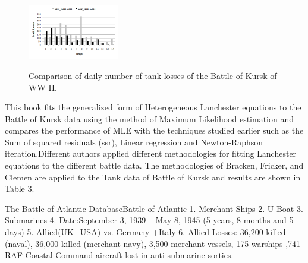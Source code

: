 \documentclass[]{article}
\begin{document}
\medskip

\begin{figure}
\centering
  \includegraphics[width=4cm]{figure3.eps.png}\\
  \caption{Comparison of daily number of tank losses of the Battle of Kursk of WW II.}
\end{figure}
This book fits the generalized form of Heterogeneous Lanchester equations to the Battle of Kursk data using the method of Maximum Likelihood estimation and compares the performance of MLE with the techniques studied earlier such as the Sum of squared residuals (\acrshort{ssr}), Linear regression and Newton-Raphson iteration.Different authors applied different methodologies for fitting Lanchester equations to the different battle data. The methodologies of Bracken, Fricker, and Clemen are applied to the Tank data of Battle of Kursk and results are shown in Table 3.

The Battle of Atlantic Database\gls{Battle of Atlantic}
1. Merchant Ships
2. U Boat
3. Submarines
4. Date:September 3, 1939 – May 8, 1945 (5 years, 8 months and 5 days)
5. Allied(UK+USA) vs. Germany +Italy
6. Allied Losses: 36,200 killed (naval), 36,000 killed (merchant navy),
3,500 merchant vessels, 175 warships ,741 RAF Coastal Command aircraft lost in anti-submarine sorties.\cite{WikiBattleOfAtlantic}
\newpage
\end{document}
